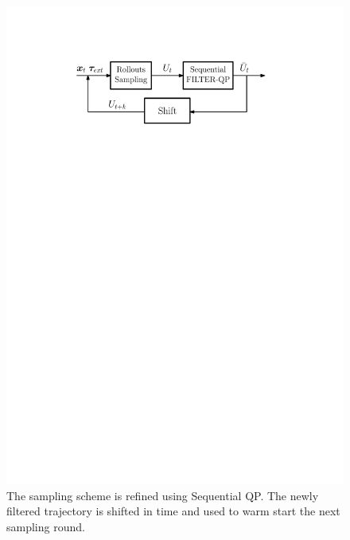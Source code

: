 \begin{figure}[h!]
\centering
\includegraphics[width=0.8\columnwidth]{figures/schemes/stochastic_controller.pdf}
\caption{The sampling scheme is refined using Sequential QP. The newly filtered trajectory is shifted in time and used to warm start the next sampling round.} \label{fig:sampling_scheme}
\end{figure}
